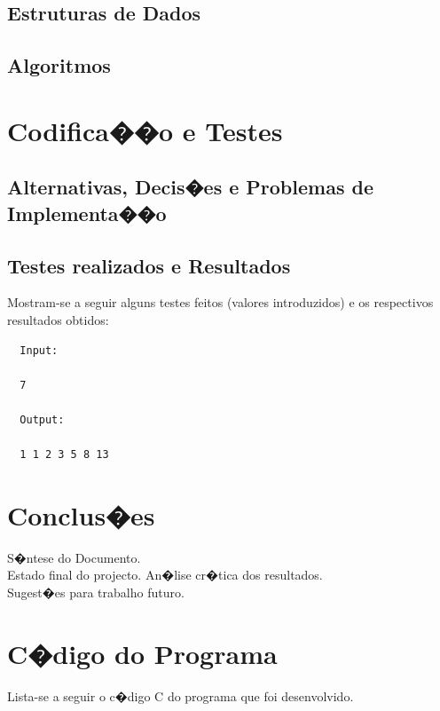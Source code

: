 \documentclass[a4paper,titlepage]{article}
\begin{document}
\subsection{Estruturas de Dados}
\subsection{Algoritmos}

\section{Codifica��o e Testes}
\subsection{Alternativas, Decis�es e Problemas de Implementa��o}
\subsection{Testes realizados e Resultados}

Mostram-se a seguir alguns testes feitos (valores introduzidos) e os
respectivos resultados obtidos:

\begin{Verbatim}
  Input:

  7

  Output:

  1 1 2 3 5 8 13
\end{Verbatim}


\section{Conclus�es}
S�ntese do Documento.\\
Estado final do projecto. An�lise cr�tica dos resultados.\\
Sugest�es para trabalho futuro.

\appendix
\section{C�digo do Programa}

Lista-se a seguir o c�digo \textsf{C} do programa que foi
desenvolvido.
\end{document}
